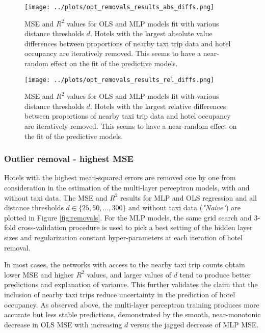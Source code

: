 \documentclass[useAMS, usenatbib]{biom}
\begin{document}
\begin{figure}
	\centering
    \captionsetup{justification=centering}
	\texttt{[image: ../plots/opt\_removals\_results\_abs\_diffs.png]}
	\caption{MSE and $R^2$ values for OLS and MLP models fit with various distance thresholds $d$. Hotels with the largest absolute value differences between proportions of nearby taxi trip data and hotel occupancy are iteratively removed. This seems to have a near-random effect on the fit of the predictive models.}
	\label{fig:abs_diffs_removals}
\end{figure}

\begin{figure}
	\centering
    \captionsetup{justification=centering}
	\texttt{[image: ../plots/opt\_removals\_results\_rel\_diffs.png]}
	\caption{MSE and $R^2$ values for OLS and MLP models fit with various distance thresholds $d$. Hotels with the largest relative differences between proportions of nearby taxi trip data and hotel occupancy are iteratively removed. This seems to have a near-random effect on the fit of the predictive models.}
	\label{fig:rel_diffs_removals}
\end{figure}

\subsubsection{Outlier removal - highest MSE}
\label{ss:outlier_mse}

Hotels with the highest mean-squared errors are removed one by one from consideration in the estimation of the multi-layer perceptron models, with and without taxi data. The MSE and $R^2$ results for MLP and OLS regression and all distance thresholds $d \in \{25, 50, ..., 300 \}$ and without taxi data (\textit{"Naive"}) are plotted in Figure \ref{fig:removals}. For the MLP models, the same grid search and 3-fold cross-validation procedure is used to pick a best setting of the hidden layer sizes and regularization constant hyper-parameters at each iteration of hotel removal.

In most cases, the networks with access to the nearby taxi trip counts obtain lower MSE and higher $R^2$ values, and larger values of $d$ tend to produce better predictions and explanation of variance. This further validates the claim that the inclusion of nearby taxi trips reduce uncertainty in the prediction of hotel occupancy. As observed above, the multi-layer perceptron training produces more accurate but less stable predictions, demonstrated by the smooth, near-monotonic decrease in OLS MSE with increasing $d$ versus the jagged decrease of MLP MSE. 
\end{document}
